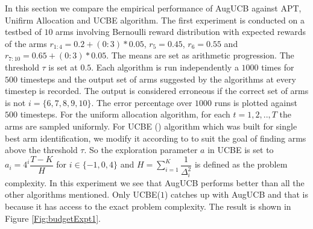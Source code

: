 	In this section we compare the empirical performance of AugUCB against APT, Unifirm Allocation and UCBE algorithm. The first experiment is conducted on a testbed of $10$ arms involving Bernoulli reward distribution with expected rewards of the arms $r_{1:4}=0.2+(0:3)*0.05$, $r_{5}=0.45$, $r_{6}=0.55$ and $r_{7:10}=0.65+(0:3)*0.05$. The means are set as arithmetic progression. The threshold $\tau$ is set at $0.5$. Each algorithm is run independently a $1000$ times for $500$ timesteps and the output set of arms suggested by the algorithms at every timestep is recorded. The output is considered erroneous if the correct set of arms is not $i=\lbrace 6,7,8,9,10 \rbrace$. The error percentage over $1000$ runs is plotted against $500$ timesteps. For the uniform allocation algorithm, for each $t=1,2,..,T$ the arms are sampled uniformly. For UCBE (\cite{audibert2009exploration}) algorithm which was built for single best arm identification, we modify it according to \cite{locatelli2016optimal} to suit the goal of finding arms above the threshold $\tau$. So the exploration parameter $a$ in UCBE is set to $a_{i}=4^{i}\dfrac{T-K}{H}$ for $i\in \lbrace -1,0,4 \rbrace$ and $H=\sum_{i=1}^{K}\dfrac{1}{\Delta_{i}^{2}}$ is defined as the problem complexity. In this experiment we see that AugUCB performs better than all the other algorithms mentioned. Only UCBE($1$) catches up with AugUCB and that is because it has access to the exact problem complexity. The result is shown in Figure \ref{Fig:budgetExpt1}.
	
